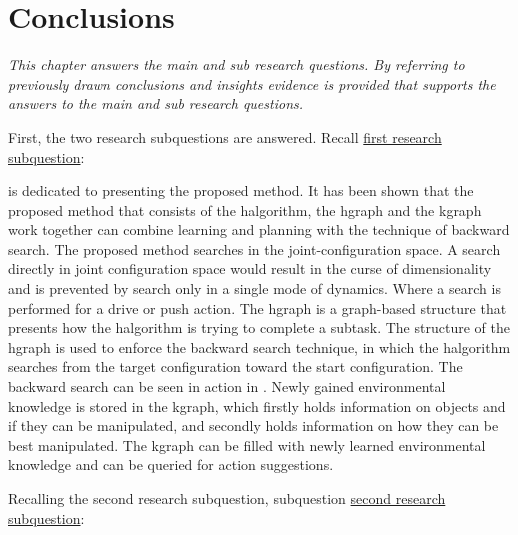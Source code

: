 \chapter{Conclusions}%
\label{chap:conclusion}
\textit{This chapter answers the main and sub research questions. By referring to previously drawn conclusions and insights evidence is provided that supports the answers to the main and sub research questions.\bs}

First, the two research subquestions are answered. Recall \hyperref[researchsubquestion:does_it_work]{first research subquestion}:\vspace{0.5\baselineskip}\\
\textit{\vspace{0.5\baselineskip}}\bs

 is dedicated to presenting the proposed method. It has been shown that the proposed method that consists of the \ac{halgorithm}, the \ac{hgraph} and the \ac{kgraph} work together can combine learning and planning with the technique of backward search. The proposed method searches in the joint-configuration space. A search directly in joint configuration space would result in the curse of dimensionality and is prevented by search only in a single mode of dynamics. Where a search is performed for a drive or push action. The \ac{hgraph} is a graph-based structure that presents how the \ac{halgorithm} is trying to complete a subtask. The structure of the \ac{hgraph} is used to enforce the backward search technique, in which the \ac{halgorithm} searches from the target configuration toward the start configuration. The backward search can be seen in action in . Newly gained environmental knowledge is stored in the \ac{kgraph}, which firstly holds information on objects and if they can be manipulated, and secondly holds information on how they can be best manipulated. The \ac{kgraph} can be filled with newly learned environmental knowledge and can be queried for action suggestions.\bs

Recalling the second research subquestion, subquestion \hyperref[researchsubquestion:does_it_compare]{second research subquestion}:\vspace{0.5\baselineskip}\\
\textit{}\vspace{0.5\baselineskip}\bs



